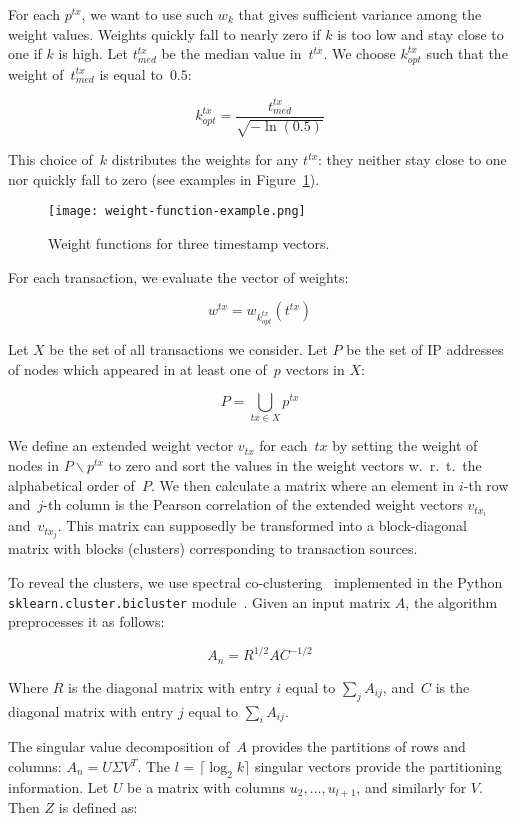 For each $p^{tx}$, we want to use such $w_k$ that gives sufficient variance among the weight values.
Weights quickly fall to nearly zero if $k$ is too low and stay close to one if $k$ is high.
Let $t^{tx}_{med}$ be the median value in~$t^{tx}$.
We choose $k^{tx}_{opt}$ such that the weight of~$t^{tx}_{med}$ is equal to~$0.5$:

\[
k^{tx}_{opt} = \frac{t^{tx}_{med}}{\sqrt{-\ln(0.5)}}
\]

This choice of~$k$ distributes the weights for any $t^{tx}$: they neither stay close to one nor quickly fall to zero (see examples in Figure~\ref{fig:weight}).
\begin{figure}
	\centering
	\texttt{[image: weight-function-example.png]}
	\caption{Weight functions for three timestamp vectors.}
	\label{fig:weight}
\end{figure}
For each transaction, we evaluate the vector of weights:

\[
w^{tx} = w_{k^{tx}_{opt}}(t^{tx})
\]

Let $X$ be the set of all transactions we consider.
Let $P$ be the set of IP addresses of nodes which appeared in at least one of~$p$ vectors in $X$:

\[
P = \bigcup\limits_{tx \in X} p^{tx}
\]

We define an extended weight vector $v_{tx}$ for each~$tx$ by setting the weight of nodes in $P \backslash p^{tx}$ to zero and sort the values in the weight vectors w.~r.~t.~the alphabetical order of~$P$.
We then calculate a matrix where an element in $i$-th row and~$j$-th column is the Pearson correlation of the extended weight vectors $v_{tx_i}$ and~$v_{tx_j}$.
This matrix can supposedly be transformed into a block-diagonal matrix with blocks (clusters) corresponding to transaction sources.

To reveal the clusters, we use spectral co-clustering~\cite{Dhillon2001} implemented in the Python \texttt{sklearn.cluster.bicluster} module~\cite{scikitlearn2018}.
Given an input matrix $A$, the algorithm preprocesses it as follows:

\[
A_n = R^{1/2}AC^{-1/2}
\]

Where $R$ is the diagonal matrix with entry $i$ equal to $\sum_{j} A_{ij}$, and~$C$ is the diagonal matrix with entry $j$ equal to $\sum_{i} A_{ij}$.

The singular value decomposition of~$A$ provides the partitions of rows and columns: $A_{n}=U \Sigma V^{T}$.
The $l$ = $\lceil \log_2 k \rceil$ singular vectors provide the partitioning information.
Let $U$ be a matrix with columns $u_2,\dots,u_{l+1}$, and similarly for $V$.
Then $Z$ is defined as:


